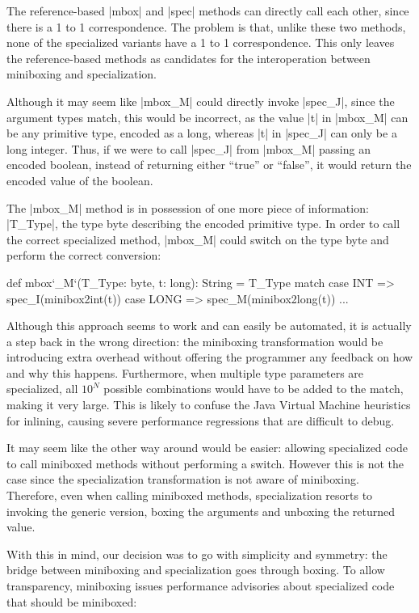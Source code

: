 The reference-based |mbox| and |spec| methods can directly call each other, since there is a 1 to 1 correspondence. The problem is that, unlike these two methods, none of the specialized variants have a 1 to 1 correspondence. This only leaves the reference-based methods as candidates for the interoperation between miniboxing and specialization.

Although it may seem like |mbox_M| could directly invoke |spec_J|, since the argument types match, this would be incorrect, as the value |t| in |mbox_M| can be any primitive type, encoded as a long, whereas |t| in |spec_J| can only be a long integer. Thus, if we were to call |spec_J| from |mbox_M| passing an encoded boolean, instead of returning either ``true'' or ``false'', it would return the encoded value of the boolean.

The |mbox_M| method is in possession of one more piece of information: |T_Type|, the type byte describing the encoded primitive type. In order to call the correct specialized method, |mbox_M| could switch on the type byte and perform the correct conversion:

\begin{lstlisting-nobreak}
 def mbox`_M`(T_Type: byte, t: long): String =
   T_Type match {
     case INT => spec_I(minibox2int(t))
     case LONG => spec_M(minibox2long(t))
     ...
   }
\end{lstlisting-nobreak}

Although this approach seems to work and can easily be automated, it is actually a  step back in the wrong direction: the miniboxing transformation would be introducing extra overhead without offering the programmer any feedback on how and why this happens. Furthermore, when multiple type parameters are specialized, all $10^N$ possible combinations would have to be added to the match, making it very large. This is likely to confuse the Java Virtual Machine heuristics for inlining, causing severe performance regressions that are difficult to debug.

It may seem like the other way around would be easier: allowing specialized code to call miniboxed methods without performing a switch. However this is not the case since the specialization transformation is not aware of miniboxing. Therefore, even when calling miniboxed methods, specialization resorts to invoking the generic version, boxing the arguments and unboxing the returned value.

With this in mind, our decision was to go with simplicity and symmetry: the bridge between miniboxing and specialization goes through boxing. To allow transparency, miniboxing issues performance advisories about specialized code that should be miniboxed:

